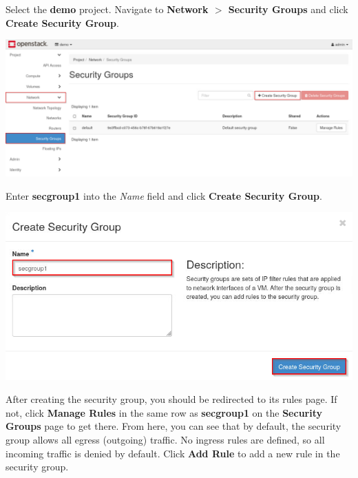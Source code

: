 \documentclass[letterpaper, 12pt]{article}
\begin{document}
\begin{enumerate}
    \begin{labstep}
        Select the \textbf{demo} project.
        Navigate to \textbf{Network $>$ Security Groups} and click \textbf{Create Security Group}.

        \begin{center}
            \includegraphics[width=\linewidth]{images/part1/step4.png}
        \end{center}
    \end{labstep}

    \begin{labstep}
        Enter \textbf{secgroup1} into the \textit{Name} field and click \textbf{Create Security Group}.

        \begin{center}
            \includegraphics[width=\linewidth]{images/part1/step5.png}
        \end{center}
    \end{labstep}

    \begin{labstep}
        After creating the security group, you should be redirected to its rules page.
        If not, click \textbf{Manage Rules} in the same row as \textbf{secgroup1} on the \textbf{Security Groups} page to get there.
        From here, you can see that by default, the security group allows all egress (outgoing) traffic.
        No ingress rules are defined, so all incoming traffic is denied by default.
        Click \textbf{Add Rule} to add a new rule in the security group.


\end{labstep}
\end{enumerate}
\end{document}
